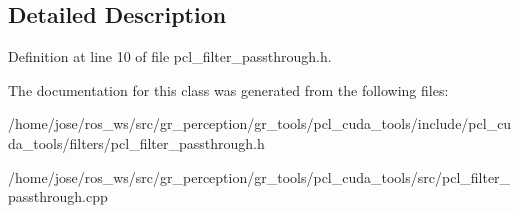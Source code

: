 \subsection{Detailed Description}


Definition at line 10 of file pcl\+\_\+filter\+\_\+passthrough.\+h.



The documentation for this class was generated from the following files\+:\begin{DoxyCompactItemize}
\item 
/home/jose/ros\+\_\+ws/src/gr\+\_\+perception/gr\+\_\+tools/pcl\+\_\+cuda\+\_\+tools/include/pcl\+\_\+cuda\+\_\+tools/filters/pcl\+\_\+filter\+\_\+passthrough.\+h\item 
/home/jose/ros\+\_\+ws/src/gr\+\_\+perception/gr\+\_\+tools/pcl\+\_\+cuda\+\_\+tools/src/pcl\+\_\+filter\+\_\+passthrough.\+cpp\end{DoxyCompactItemize}
